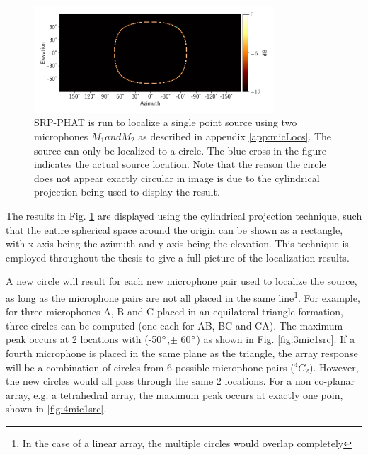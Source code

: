 \begin{figure}[H]
    \centering
    \includegraphics[width=0.8\textwidth]{Figures/2mic1srcRes.png}
    \caption{SRP-PHAT is run to localize a single point source using two microphones $M_{1} and M_{2}$ as described in appendix \ref{app:micLocs}. The source can only be localized to a circle. The blue cross in the figure indicates the actual source location. Note that the reason the circle does not appear exactly circular in image is due to the cylindrical projection being used to display the result.}
    \label{fig:2mic1src}
\end{figure}
The results in Fig. \ref{fig:2mic1src} are displayed using the cylindrical projection technique, such that the entire spherical space around the origin can be shown as a rectangle, with x-axis being the azimuth and y-axis being the elevation. This technique is employed throughout the thesis to give a full picture of the localization results.

A new circle will result for each new microphone pair used to localize the source, as long as the microphone pairs are not all placed in the same line\footnote{In the case of a linear array, the multiple circles would overlap completely}. For example, for three microphones A, B and C placed in an equilateral triangle formation, three circles can be computed (one each for AB, BC and CA). The maximum peak occurs at 2 locations with (-50$\degree$,$\pm$ 60$\degree$) as shown in Fig. \ref{fig:3mic1src}. If a fourth microphone is placed in the same plane as the triangle, the array response will be a combination of circles from 6 possible microphone pairs ($^4C_2$). However, the new circles would all pass through the same 2 locations. For a non co-planar array, e.g. a tetrahedral array, the maximum peak occurs at exactly one poin, shown in \ref{fig:4mic1src}. 
